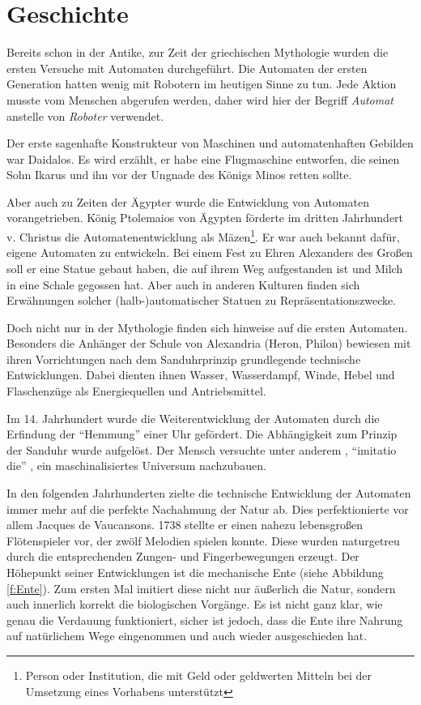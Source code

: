 \section{Geschichte}
Bereits schon in der Antike, zur Zeit der griechischen Mythologie wurden die ersten Versuche mit Automaten durchgeführt. Die Automaten der ersten Generation hatten wenig mit Robotern im heutigen Sinne zu tun. Jede Aktion musste vom Menschen abgerufen werden, daher wird hier der Begriff \textit{Automat} anstelle von \textit{Roboter} verwendet.

Der erste sagenhafte Konstrukteur von Maschinen und automatenhaften Gebilden war Daidalos. Es wird erzählt, er habe eine Flugmaschine entworfen, die seinen Sohn Ikarus und ihn vor der Ungnade des Königs Minos retten sollte. 

Aber auch zu Zeiten der Ägypter wurde die Entwicklung von Automaten vorangetrieben. König Ptolemaios von Ägypten förderte im dritten Jahrhundert v. Christus die Automatenentwicklung als Mäzen\footnote{Person oder Institution, die mit Geld oder geldwerten Mitteln bei der Umsetzung eines Vorhabens unterstützt}. Er war auch bekannt dafür, eigene Automaten zu entwickeln. Bei einem Fest zu Ehren Alexanders des Großen soll er eine Statue gebaut haben, die auf ihrem Weg aufgestanden ist und Milch in eine Schale gegossen hat. Aber auch in anderen Kulturen finden sich Erwähnungen solcher (halb-)automatischer Statuen zu Repräsentationszwecke.

Doch nicht nur in der Mythologie finden sich hinweise auf die ersten Automaten. Besonders die Anhänger der Schule von Alexandria (Heron, Philon) bewiesen mit ihren Vorrichtungen nach dem Sanduhrprinzip grundlegende technische Entwicklungen. Dabei dienten ihnen Wasser, Wasserdampf, Winde, Hebel und Flaschenzüge als Energiequellen und Antriebsmittel.

Im 14. Jahrhundert wurde die Weiterentwicklung der Automaten durch die Erfindung der "`Hemmung"' einer Uhr gefördert. Die Abhängigkeit zum Prinzip der Sanduhr wurde aufgelöst. Der Mensch versuchte unter anderem , "`imitatio die"' , ein maschinalisiertes Universum nachzubauen. 

In den folgenden Jahrhunderten zielte die technische Entwicklung der Automaten immer mehr auf die perfekte Nachahmung der Natur  ab. Dies perfektionierte vor allem Jacques de Vaucansons. 1738 stellte er einen nahezu lebensgroßen Flötenspieler vor, der zwölf Melodien spielen konnte. Diese wurden naturgetreu durch die entsprechenden Zungen- und Fingerbewegungen erzeugt. Der Höhepunkt seiner Entwicklungen ist die mechanische Ente (siehe Abbildung \ref{f:Ente}). Zum ersten Mal imitiert diese nicht nur äußerlich die Natur, sondern auch innerlich korrekt die biologischen Vorgänge. Es ist nicht ganz klar, wie genau die Verdauung funktioniert, sicher ist jedoch, dass die Ente ihre Nahrung auf natürlichem Wege eingenommen und auch wieder ausgeschieden hat.  

